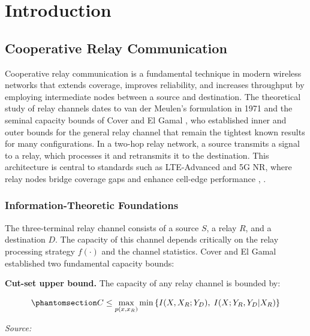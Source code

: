 \chapter{Introduction}\label{sec:introduction}

\section{Cooperative Relay Communication}\label{sec:cooperative-relay-communication}

Cooperative relay communication is a fundamental technique in modern wireless networks that extends coverage, improves reliability, and increases throughput by employing intermediate nodes between a source and destination. The theoretical study of relay channels dates to van der Meulen's formulation in 1971 and the seminal capacity bounds of Cover and El Gamal \cite{cover1979capacity}, who established inner and outer bounds for the general relay channel that remain the tightest known results for many configurations. In a two-hop relay network, a source transmits a signal to a relay, which processes it and retransmits it to the destination. This architecture is central to standards such as LTE-Advanced and 5G NR, where relay nodes bridge coverage gaps and enhance cell-edge performance \cite{laneman2004cooperative}, \cite{nosratinia2004cooperative}.

\subsection{Information-Theoretic Foundations}\label{sec:information-theoretic-foundations}

The three-terminal relay channel consists of a source \(S\), a relay \(R\), and a destination \(D\). The capacity of this channel depends critically on the relay processing strategy \(f(\cdot)\) and the channel statistics. Cover and El Gamal \cite{cover1979capacity} established two fundamental capacity bounds:

\textbf{Cut-set upper bound.} The capacity of any relay channel is bounded by:

\begin{equation}\protect\phantomsection\label{eq:relay-capacity-bound}{C \leq \max_{p(x, x_R)} \min\left\{I(X, X_R; Y_D), \; I(X; Y_R, Y_D | X_R)\right\}
}\end{equation}\par{\small\textit{Source: \cite{cover1979capacity, elgamal2011network}}}

